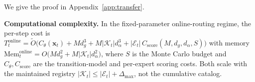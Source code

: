 We give the proof in Appendix~\ref{app:transfer}.

\textbf{Computational complexity.}
In the fixed-parameter online-routing regime, the per-step cost is
\(T_t^{\mathrm{online}}
=
\widetilde O\big(
C_\theta(\mathbf{x}_t) + M d_g^3 + M |\mathcal K_t| d_\alpha^3 + |\mathcal E_t|\, C_{\mathrm{score}}(M,d_g,d_\alpha,S)
\big)\)
with memory
\(\mathrm{Mem}_t^{\mathrm{online}}
=
O\big(
M d_g^2 + M |\mathcal K_t| d_\alpha^2
\big)\),
where \(S\) is the Monte Carlo budget and \(C_\theta,C_{\mathrm{score}}\) are the transition-model and
per-expert scoring costs. Both scale with the maintained registry \(|\mathcal K_t| \le |\mathcal E_t|
+ \Delta_{\max}\), not the cumulative catalog.
